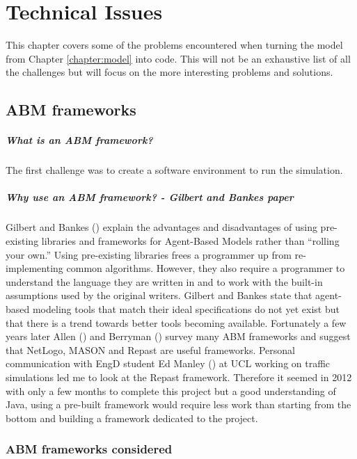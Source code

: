 \chapter{Technical Issues}\label{chapter:technicalissues}
This chapter covers some of the problems encountered when turning the model from Chapter \ref{chapter:model} into code. This will not be an exhaustive list of all the challenges but will focus on the more interesting problems and solutions.

  \section{ABM frameworks}
    \paragraph{What is an ABM framework?}
    The first challenge was to create a software environment to run the simulation. 
    \paragraph{Why use an ABM framework? - Gilbert and Bankes paper}
    Gilbert and Bankes (\cite{Gilbert2002}) explain the advantages and
    disadvantages of using pre-existing libraries and frameworks for Agent-Based Models rather
    than ``rolling your own.'' Using pre-existing libraries frees a
    programmer up from re-implementing common
    algorithms. However, they also require a programmer to understand the
    language they are written in and to work with the built-in
    assumptions used by the original writers. Gilbert and Bankes state
    that agent-based modeling tools that match their ideal specifications
    do not yet exist but that there is a trend towards better
    tools becoming available. Fortunately a few years later Allen (\cite{Allan2009}) and Berryman (\cite{Berryman2008}) survey many ABM frameworks and suggest that NetLogo, MASON and Repast are useful frameworks. Personal communication with EngD student Ed Manley (\cite{Manley2012}) at UCL working on traffic simulations led me to look at the Repast framework. Therefore it seemed in 2012 with only a few months to complete this project but a good understanding of Java, using a pre-built framework would require less work than starting from the bottom and building a framework dedicated to the project.
    \subsection{ABM frameworks considered}
